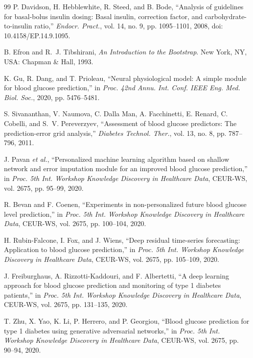 \documentclass[journal]{IEEEtran}
\begin{document}
\begin{thebibliography}{99}
\label{ref77label} P. Davidson, H. Hebblewhite, R. Steed, and B. Bode, ``Analysis of guidelines for basal-bolus insulin dosing: Basal insulin, correction factor, and carbohydrate-to-insulin ratio,'' \emph{Endocr. Pract.}, vol. 14, no. 9, pp. 1095--1101, 2008, doi: 10.4158/EP.14.9.1095.

\label{ref78label} B. Efron and R.~J. Tibshirani, \emph{An Introduction to the Bootstrap}. New York, NY, USA: Chapman \& Hall, 1993.

\label{ref59label} K. Gu, R. Dang, and T. Prioleau, ``Neural physiological model: A simple module for blood glucose prediction,'' in \emph{Proc. 42nd Annu. Int. Conf. IEEE Eng. Med. Biol. Soc.}, 2020, pp. 5476--5481.

\label{ref53label} S. Sivananthan, V. Naumova, C. Dalla Man, A. Facchinetti, E. Renard, C. Cobelli, and S.~V. Pereverzyev, ``Assessment of blood glucose predictors: The prediction-error grid analysis,'' \emph{Diabetes Technol. Ther.}, vol. 13, no. 8, pp. 787--796, 2011.

\label{ref60label} J. Pavan \emph{et al.}, ``Personalized machine learning algorithm based on shallow network and error imputation module for an improved blood glucose prediction,'' in \emph{Proc. 5th Int. Workshop Knowledge Discovery in Healthcare Data}, CEUR-WS, vol. 2675, pp. 95--99, 2020.

\label{ref61label} R. Bevan and F. Coenen, ``Experiments in non-personalized future blood glucose level prediction,'' in \emph{Proc. 5th Int. Workshop Knowledge Discovery in Healthcare Data}, CEUR-WS, vol. 2675, pp. 100--104, 2020.

\label{ref62label} H. Rubin-Falcone, I. Fox, and J. Wiens, ``Deep residual time-series forecasting: Application to blood glucose prediction,'' in \emph{Proc. 5th Int. Workshop Knowledge Discovery in Healthcare Data}, CEUR-WS, vol. 2675, pp. 105--109, 2020.

\label{ref63label} J. Freiburghaus, A. Rizzotti-Kaddouri, and F. Albertetti, ``A deep learning approach for blood glucose prediction and monitoring of type 1 diabetes patients,'' in \emph{Proc. 5th Int. Workshop Knowledge Discovery in Healthcare Data}, CEUR-WS, vol. 2675, pp. 131--135, 2020.

\label{ref65label} T. Zhu, X. Yao, K. Li, P. Herrero, and P. Georgiou, ``Blood glucose prediction for type 1 diabetes using generative adversarial networks,'' in \emph{Proc. 5th Int. Workshop Knowledge Discovery in Healthcare Data}, CEUR-WS, vol. 2675, pp. 90--94, 2020.


\end{thebibliography}
\end{document}
